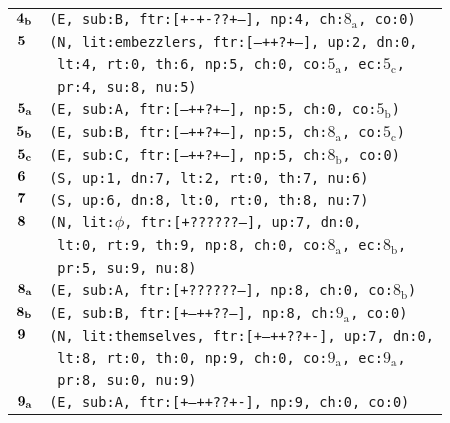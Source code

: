 \documentclass{article}
\begin{document}
\begin{minipage}{\textwidth}
{\begin{tabular}{|r|l|}
    ${\textbf{\textrm{4}}_{\textbf{\textrm{b}}}}$ & \texttt{\texttt{(E,~sub:B,~ftr:[+-+-??+--],~np:4,~ch:${\textrm{8}_{\textrm{a}}}$,~co:0)}} \\
    ${\textbf{\textrm{5}}_{\phantom{z}}}$ & \texttt{\texttt{(N,~lit:embezzlers,~ftr:[---++?+--],~up:2,~dn:0,}} \\
    & \texttt{\texttt{~lt:4,~rt:0,~th:6,~np:5,~ch:0,~co:${\textrm{5}_{\textrm{a}}}$,~ec:${\textrm{5}_{\textrm{c}}}$,}} \\
    & \texttt{\texttt{~pr:4,~su:8,~nu:5)}} \\
    ${\textbf{\textrm{5}}_{\textbf{\textrm{a}}}}$ & \texttt{\texttt{(E,~sub:A,~ftr:[---++?+--],~np:5,~ch:0,~co:${\textrm{5}_{\textrm{b}}}$)}} \\
    ${\textbf{\textrm{5}}_{\textbf{\textrm{b}}}}$ & \texttt{\texttt{(E,~sub:B,~ftr:[---++?+--],~np:5,~ch:${\textrm{8}_{\textrm{a}}}$,~co:${\textrm{5}_{\textrm{c}}}$)}} \\
    ${\textbf{\textrm{5}}_{\textbf{\textrm{c}}}}$ & \texttt{\texttt{(E,~sub:C,~ftr:[---++?+--],~np:5,~ch:${\textrm{8}_{\textrm{b}}}$,~co:0)}} \\
    ${\textbf{\textrm{6}}_{\phantom{z}}}$ & \texttt{\texttt{(S,~up:1,~dn:7,~lt:2,~rt:0,~th:7,~nu:6)}} \\
    ${\textbf{\textrm{7}}_{\phantom{z}}}$ & \texttt{\texttt{(S,~up:6,~dn:8,~lt:0,~rt:0,~th:8,~nu:7)}} \\
    ${\textbf{\textrm{8}}_{\phantom{z}}}$ & \texttt{\texttt{(N,~lit:$\phi$,~ftr:[+??????--],~up:7,~dn:0,}} \\
    & \texttt{\texttt{~lt:0,~rt:9,~th:9,~np:8,~ch:0,~co:${\textrm{8}_{\textrm{a}}}$,~ec:${\textrm{8}_{\textrm{b}}}$,}} \\
    & \texttt{\texttt{~pr:5,~su:9,~nu:8)}} \\
    ${\textbf{\textrm{8}}_{\textbf{\textrm{a}}}}$ & \texttt{\texttt{(E,~sub:A,~ftr:[+??????--],~np:8,~ch:0,~co:${\textrm{8}_{\textrm{b}}}$)}} \\
    ${\textbf{\textrm{8}}_{\textbf{\textrm{b}}}}$ & \texttt{\texttt{(E,~sub:B,~ftr:[+--++??--],~np:8,~ch:${\textrm{9}_{\textrm{a}}}$,~co:0)}} \\
    ${\textbf{\textrm{9}}_{\phantom{z}}}$ & \texttt{\texttt{(N,~lit:themselves,~ftr:[+--++??+-],~up:7,~dn:0,}} \\
    & \texttt{\texttt{~lt:8,~rt:0,~th:0,~np:9,~ch:0,~co:${\textrm{9}_{\textrm{a}}}$,~ec:${\textrm{9}_{\textrm{a}}}$,}} \\
    & \texttt{\texttt{~pr:8,~su:0,~nu:9)}} \\
    ${\textbf{\textrm{9}}_{\textbf{\textrm{a}}}}$ & \texttt{\texttt{(E,~sub:A,~ftr:[+--++??+-],~np:9,~ch:0,~co:0)}} \\
    \hline
  \end{tabular}
  }
\end{minipage}
\bigbreak
\end{document}
